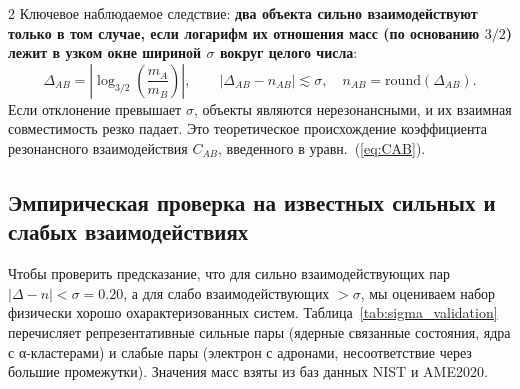 \documentclass[11pt,a4paper]{article}
\begin{document}
\begin{multicols}{2}
		Ключевое наблюдаемое следствие: \textbf{два объекта сильно взаимодействуют только в том случае, если логарифм их отношения масс (по основанию \(3/2\)) лежит в узком окне шириной \(\sigma\) вокруг целого числа}:
		\[
		\Delta_{AB} = \left| \log_{3/2}\left( \frac{m_A}{m_B} \right) \right|,\qquad
		|\Delta_{AB} - n_{AB}| \lesssim \sigma,\quad n_{AB} = \text{round}(\Delta_{AB}).
		\]
		Если отклонение превышает \(\sigma\), объекты являются нерезонансными, и их взаимная совместимость резко падает. Это теоретическое происхождение коэффициента резонансного взаимодействия \(C_{AB}\), введенного в уравн.~(\ref{eq:CAB}).
		
		\subsection{Эмпирическая проверка на известных сильных и слабых взаимодействиях}
		
		Чтобы проверить предсказание, что для сильно взаимодействующих пар \(|\Delta - n| < \sigma = 0.20\), а для слабо взаимодействующих \(> \sigma\), мы оцениваем набор физически хорошо охарактеризованных систем. Таблица~\ref{tab:sigma_validation} перечисляет репрезентативные сильные пары (ядерные связанные состояния, ядра с α-кластерами) и слабые пары (электрон с адронами, несоответствие через большие промежутки). Значения масс взяты из баз данных NIST и AME2020.
		

\end{multicols}
\end{document}
